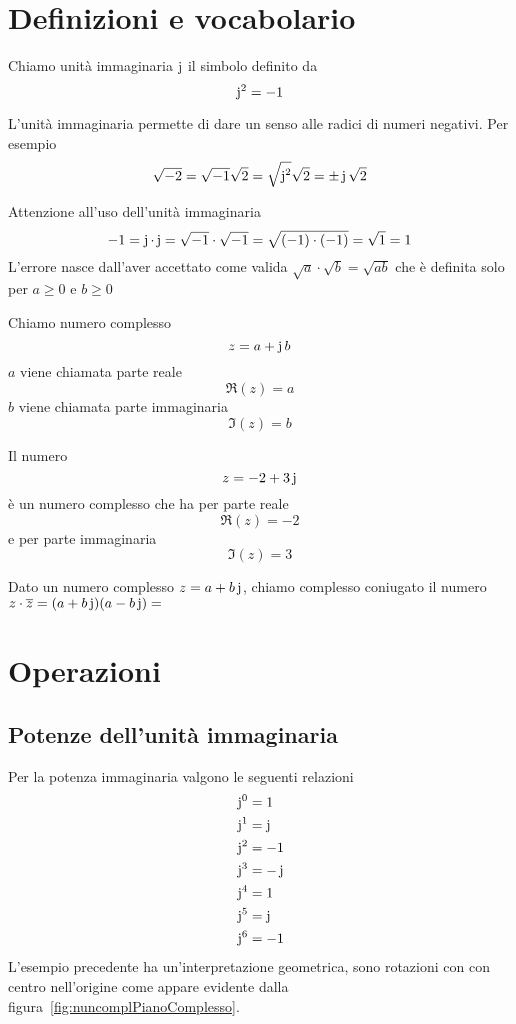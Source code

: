 \section{Definizioni e vocabolario}
\label{sec:NumCompDefinizioniVocabolario}
\begin{definizione}
	Chiamo unità immaginaria $\operatorname{j}$ il simbolo definito da \[\operatorname{j}^2=-1\]  
\end{definizione}
L'unità immaginaria permette di dare un senso alle radici di numeri negativi. Per esempio \[\sqrt{-2}=\sqrt{-1}\sqrt{2}=\sqrt{\operatorname{j}^2}\sqrt{2}=\pm\operatorname{j}\sqrt{2}\]
\begin{esempio}
Attenzione all'uso dell'unità immaginaria
\[-1=\operatorname{j}\cdot\operatorname{j}=\sqrt{-1}\cdot\sqrt{-1}=\sqrt{(-1)\cdot(-1)}=\sqrt{1}=1 \]L'errore nasce dall'aver accettato come valida $\sqrt{a}\cdot\sqrt{b}=\sqrt{ab}$ che è definita solo per $a\geq 0$ e $b\geq 0$
\end{esempio}
\begin{definizione}
	Chiamo numero complesso \[z=a+\operatorname{j} b\] $a$ viene chiamata parte reale \[\Re\left(z\right)=a\]
	$b$ viene chiamata parte immaginaria\[\Im\left(z\right)=b \] 
\end{definizione}
\begin{esempio}
Il numero \[z=-2+3\operatorname{j} \] è un numero complesso che ha per parte reale \[\Re(z)=-2\]  e per parte immaginaria \[\Im(z)=3\]
\end{esempio}
\begin{definizione}
	Dato un numero complesso $z=a+b\operatorname{j}$,  chiamo complesso coniugato il numero $z\cdot\overline{z}=(a+b\operatorname{j})(a-b\operatorname{j})=$
\end{definizione}
\section{Operazioni}
\label{sec:NumCompOperazioni}
\subsection{Potenze dell'unità immaginaria}
Per la potenza immaginaria valgono le seguenti relazioni
\begin{align*}
	&\operatorname{j}^0=1\\
	&\operatorname{j}^1=\operatorname{j}\\
	&\operatorname{j}^2=-1\\
	&\operatorname{j}^3=-\operatorname{j}\\
	&\operatorname{j}^4=1\\
	&\operatorname{j}^5=\operatorname{j}\\
	&\operatorname{j}^6=-1
\end{align*}
L'esempio precedente ha un'interpretazione geometrica, sono rotazioni con con centro nell'origine come appare evidente dalla figura~\vref{fig:nuncomplPianoComplesso}.
